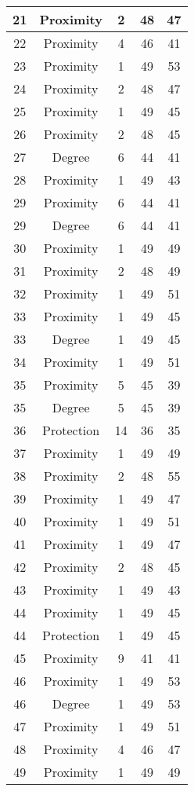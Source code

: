 \documentclass[results.tex]{subfiles}
\begin{document}
\begin{center}
\begin{tabular}{| c || c | c | c | c |}
    \hline
    21 & Proximity & 2 & 48 & 47 \\ 
    \hline
    22 & Proximity & 4 & 46 & 41 \\ 
    \hline
    23 & Proximity & 1 & 49 & 53 \\ 
    \hline
    24 & Proximity & 2 & 48 & 47 \\ 
    \hline
    25 & Proximity & 1 & 49 & 45 \\ 
    \hline
    26 & Proximity & 2 & 48 & 45 \\ 
    \hline
    27 & Degree & 6 & 44 & 41 \\ 
    \hline
    28 & Proximity & 1 & 49 & 43 \\ 
    \hline
    29 & Proximity & 6 & 44 & 41 \\ 
    \hline
    29 & Degree & 6 & 44 & 41 \\ 
    \hline
    30 & Proximity & 1 & 49 & 49 \\ 
    \hline
    31 & Proximity & 2 & 48 & 49 \\ 
    \hline
    32 & Proximity & 1 & 49 & 51 \\ 
    \hline
    33 & Proximity & 1 & 49 & 45 \\ 
    \hline
    33 & Degree & 1 & 49 & 45 \\ 
    \hline
    34 & Proximity & 1 & 49 & 51 \\ 
    \hline
    35 & Proximity & 5 & 45 & 39 \\ 
    \hline
    35 & Degree & 5 & 45 & 39 \\ 
    \hline
    36 & Protection & 14 & 36 & 35 \\ 
    \hline
    37 & Proximity & 1 & 49 & 49 \\ 
    \hline
    38 & Proximity & 2 & 48 & 55 \\ 
    \hline
    39 & Proximity & 1 & 49 & 47 \\ 
    \hline
    40 & Proximity & 1 & 49 & 51 \\ 
    \hline
    41 & Proximity & 1 & 49 & 47 \\ 
    \hline
    42 & Proximity & 2 & 48 & 45 \\ 
    \hline
    43 & Proximity & 1 & 49 & 43 \\ 
    \hline
    44 & Proximity & 1 & 49 & 45 \\ 
    \hline
    44 & Protection & 1 & 49 & 45 \\ 
    \hline
    45 & Proximity & 9 & 41 & 41 \\ 
    \hline
    46 & Proximity & 1 & 49 & 53 \\ 
    \hline
    46 & Degree & 1 & 49 & 53 \\ 
    \hline
    47 & Proximity & 1 & 49 & 51 \\ 
    \hline
    48 & Proximity & 4 & 46 & 47 \\ 
    \hline
    49 & Proximity & 1 & 49 & 49 \\ 
    \hline   \end{tabular}
\end{center}
\end{document}
